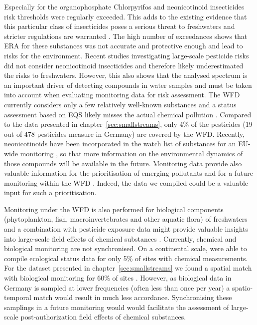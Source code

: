 Especially for the organophosphate Chlorpyrifos and neonicotinoid insecticides risk thresholds were regularly exceeded.
This adds to the existing evidence that this particular class of insecticides poses a serious threat to freshwaters and stricter regulations are warranted \citep{morrissey_neonicotinoid_2015, goulson_overview_2013}. 
The high number of exceedances shows that ERA for these substances was not accurate and protective enough and lead to risks for the environment. 
Recent studies investigating large-scale pesticide risks did not consider neonicotinoid insecticides \citep{malaj_organic_2014, stehle_pesticide_2015} and therefore likely underestimated the risks to freshwaters. 
However, this also shows that the ana\-lysed spectrum is an important driver of detecting compounds in water samples \citep{schreiner_pesticide_2016, malaj_organic_2014} and must be taken into account when evaluating monitoring data for risk assessment. 
The WFD currently considers only a few relatively well-known substances \citep{european_union_directive_2013} and a status assessment based on EQS likely misses the actual chemical pollution \citep{moschet_how_2014}. 
Compared to the data presented in chapter~\ref{sec:smallstreams}, only 4\% of the pesticides (19 out of 478 pesticides measure in Germany) are covered by the WFD.
Recently, neonicotinoids have been incorporated in the watch list of substances for an EU-wide monitoring \citep{european_union_commission_2015}, so that more information on the environmental dynamics of those compounds will be available in the future. 
Monitoring data provide also valuable information for the prioritisation of emerging pollutants and for a future monitoring within the WFD \citep{brack_towards_2017}.
Indeed, the data we compiled could be a valuable input for such a prioritisation. 

Monitoring under the WFD is also performed for biological components (phytoplankton, fish, macroinvertebrates and other aquatic flora) of freshwaters \citep{european_union_directive_2000} and a combination with pesticide exposure data might provide valuable insights into large-scale field effects of chemical substances \citep{schipper_deriving_2014}.
Currently, chemical and biological monitoring are not synchronised.
On a continental scale, \citet{malaj_organic_2014} were able to compile ecological status data for only 5\% of sites with chemical measurements.
For the dataset presented in chapter~\ref{sec:smallstreams} we found a spatial match with biological monitoring for 60\% of sites \citep{brinke_umsetzung_2016}.
However, as biological data in Germany is sampled at lower frequencies (often less than once per year) a spatio-temporal match would result in much less accordance. 
Synchronising these samplings in a future monitoring would would facilitate the assessment of large-scale post-authorization field effects of chemical substances. 



